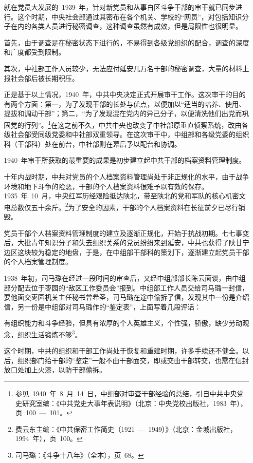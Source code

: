 就在党员大发展的~1939~年，针对新党员和从事白区斗争干部的审干就已同步进行。这个时期，中央社会部通过其密布在各个机关、学校的“网员”，对包括知识分子在内的各类人员进行秘密调查，这种调查虽然有成效，但是局限性也很明显。

首先，由于调查是在秘密状态下进行的，不易得到各级党组织的配合，调查的深度和广度都受到限制。

其次，中社部工作人员较少，无法应付延安几万名干部的秘密调查，大量的材料上报社会部后被长期积压。

正是基于以上情况，1940~年，中共中央决定正式开展审干工作。这次审干的目的有两个方面：第一，为了发现干部的长处与优点，以便加以“适当的培养、使用、提拔和调动干部”；第二，“为了发现混在党内的异己分子，以便清洗他们出党而巩固党的行列”。\footnote{参见~1940~年~8~月~14~日，中组部对审查干部经验的总结，引自中共中央党史研究室编：《中共党史大事年表说明》（北京：中央党校出版社，1983~年），页~100~—~101。}在这之前不久，中共中央也改变了中社部原垂直侦察系统，改由各级社会部受同级党委和中社部双重领导。在这次审干中，中组部和各级党委的组织科（干部科）处在前台，中社部则在幕后予以配台和协调。

1940~年审干所获取的最重要的成果是初步建立起中共干部的档案资料管理制度。

十年内战时期，中共对党员的个人档案资料管理尚处于非正规化的水平，由于战争环境和地下斗争的险恶，干部的个人档案资料很难予以有效的保存。1935~年~10~月，中央红军历经艰险抵达陕北，带至陕北的党和军队的核心机密文电总数仅五十余斤。\footnote{费云东主编：《中共保密工作简史（1921~—~1949）》（北京：金城出版社，1994~年），页~100。}为了安全的因素，干部的个人档案资料在长征前夕已尽行销毁。

党员干部个人档案资料管理制度的建立及逐渐正规化，开始于抗战初期。七七事变后，大批青年知识分子和失去组织关系的党员纷纷来到延安，中共也获得了陕甘宁边区这块较为稳定的地盘，于是，在中组部干部科的策划下，逐渐建立起党员干部的个人档案管理制度。

1938~年初，司马璐在经过一段时间的审查后，又经中组部部长陈云面谈，由中组部分配去位于枣园的“敌区工作委员会”报到。中组部工作人员交给司马璐一封信，要他面交枣园机关主任秘书曾希圣，司马璐在途中偷拆了信，发现其中一份是介绍信，另一份是中组部对司马璐作的“鉴定表”，上面写着几段评话：

\begin{quoting}
有组织能力和斗争经验，但具有浓厚的个人英雄主义，个性强，骄傲，缺少劳动观念，组织生活锻炼不够\footnote{司马璐：《斗争十八年》（全本），页~68。}。
\end{quoting}这个时期，中共的组织和干部工作尚处于恢复和重建时期，许多手续还不健全。以后，组织部门给干部的“鉴定”一般不由干部面交，即或交由干部转交，也需在信封放口处加上火漆，以防干部偷拆。

